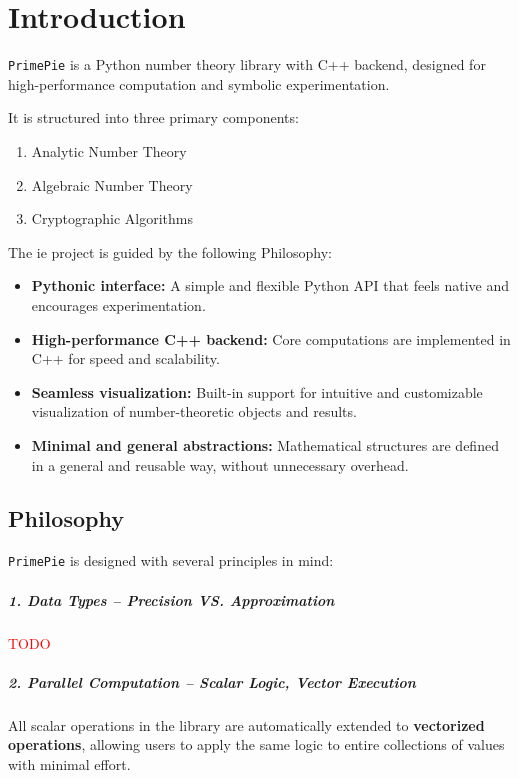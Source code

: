 \chapter{Introduction}

\texttt{PrimePie} is a Python number theory library with C++ backend, designed for high-performance computation and symbolic experimentation.

It is structured into three primary components:
\begin{enumerate}
    \item Analytic Number Theory
    \item Algebraic Number Theory
    \item Cryptographic Algorithms
\end{enumerate}
The ie project is guided by the following Philosophy:
\begin{itemize}
    \item \textbf{Pythonic interface:} A simple and flexible Python API that feels native and encourages experimentation.
    \item \textbf{High-performance C++ backend:} Core computations are implemented in C++ for speed and scalability.
    \item \textbf{Seamless visualization:} Built-in support for intuitive and customizable visualization of number-theoretic objects and results.
    \item \textbf{Minimal and general abstractions:} Mathematical structures are defined in a general and reusable way, without unnecessary overhead.
\end{itemize}


\section{Philosophy}

\texttt{PrimePie} is designed with several principles in mind:

\paragraph{1. Data Types -- Precision VS. Approximation}
\textcolor{red}{TODO}


\paragraph{2. Parallel Computation -- Scalar Logic, Vector Execution}
All scalar operations in the library are automatically extended to \textbf{vectorized operations}, allowing users to apply the same logic to entire collections of values with minimal effort.

